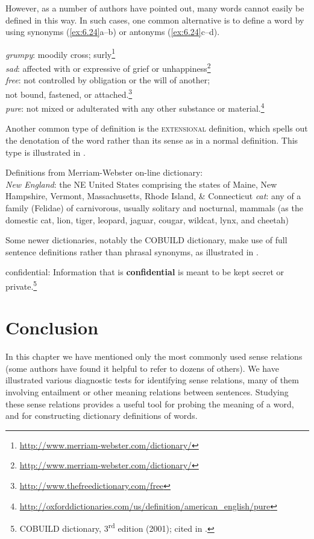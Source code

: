 However, as a number of authors have pointed out, many words cannot easily be defined in this way. In such cases, one common alternative is to define a word by using synonyms (\ref{ex:6.24}a--b) or antonyms (\ref{ex:6.24}c--d).


\ea \label{ex:6.24}
\ea \textit{grumpy}: moodily cross; surly\footnote{\url{http://www.merriam-webster.com/dictionary/}}\\
\ex \textit{sad}: affected with or expressive of grief or unhappiness\footnote{\url{http://www.merriam-webster.com/dictionary/}}\\
\ex \textit{free}: not controlled by obligation or the will of another;\\
  not bound, fastened, or attached.\footnote{\url{http://www.thefreedictionary.com/free}} \\
\ex \textit{pure}: not mixed or adulterated with any other substance or material.\footnote{\url{http://oxforddictionaries.com/us/definition/american_english/pure}} 
                       \z
\z


Another common type of definition is the \textsc{extensional} definition, which spells out the denotation of the word rather than its sense as in a normal definition. This type is illustrated in .


\ea \label{ex:6.25}
Definitions from Merriam-Webster on-line dictionary:\\
\ea   \textit{New England}: the NE United States comprising the states of Maine, New Hampshire, Vermont, Massachusetts, Rhode Island, \& Connecticut
\ex  \textit{cat}: any of a family (Felidae) of carnivorous, usually solitary and nocturnal, mammals (as the domestic cat, lion, tiger, leopard, jaguar, cougar, wildcat, lynx, and cheetah)
\z \z

Some newer dictionaries, notably the COBUILD dictionary, make use of full sentence definitions rather than phrasal synonyms, as illustrated in .

\ea \label{ex:6.26}
confidential: Information that is \textbf{confidential} is meant to be kept secret or private.\footnote{COBUILD dictionary, 3\textsuperscript{rd} edition (2001); cited in \citet{Rundell2006}.}
\z

\section{Conclusion}\label{sec:} %

In this chapter we have mentioned only the most commonly used sense relations (some authors have found it helpful to refer to dozens of others). We have illustrated various diagnostic tests for identifying sense relations, many of them involving entailment or other meaning relations between sentences. Studying these sense relations provides a useful tool for probing the meaning of a word, and for constructing dictionary definitions of words.



